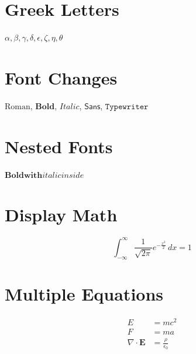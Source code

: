 \documentclass[fleqn]{article}
\begin{document}
\section*{Greek Letters}
$\alpha, \beta, \gamma, \delta, \epsilon, \zeta, \eta, \theta$

\section*{Font Changes}
$\mathrm{Roman}$, $\mathbf{Bold}$, $\mathit{Italic}$, $\mathsf{Sans}$, $\mathtt{Typewriter}$

\section*{Nested Fonts}
$\mathbf{Bold with \mathit{italic inside}}$  %

\section*{Display Math}
\[
\int_{-\infty}^{\infty} \frac{1}{\sqrt{2\pi}} e^{-\frac{x^2}{2}} \, dx = 1
\]

\section*{Multiple Equations}
\begin{align}
E &= mc^2 \\
F &= ma \\
\nabla \cdot \mathbf{E} &= \frac{\rho}{\epsilon_0}
\end{align}
\end{document}
